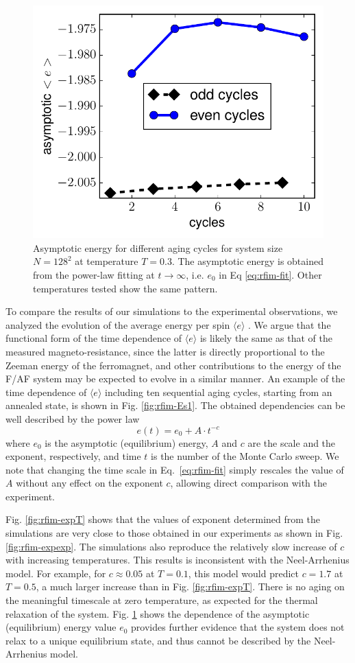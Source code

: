 \begin{figure}
\centering \includegraphics[width=0.5\columnwidth]{Chapter-4/asymptotic_E_T03_10cycles}
\protect\caption{Asymptotic energy for different aging cycles for system size $N=128^2$ at temperature $T=0.3$. The asymptotic energy is obtained from the power-law fitting at $t\rightarrow\infty$, i.e. $e_0$ in Eq \ref{eq:rfim-fit}. Other temperatures tested show the same pattern.} 
\label{fig:rfim-asm}
\end{figure}

To compare the results of our simulations to the experimental observations, we analyzed the evolution of the average
energy per spin $\langle e \rangle$ . We argue that the functional form of the time dependence of $\langle e \rangle$ is likely the same as that of the measured magneto-resistance, since the latter is directly proportional to the Zeeman energy of the ferromagnet, and other contributions to the energy of the F/AF system may be expected to evolve in a similar manner. An example of the time dependence of $\langle e \rangle$ including ten sequential aging cycles, starting from an annealed state, is shown in Fig. \ref{fig:rfim-Es1}. The obtained dependencies can be well described by the power law
\begin{equation}
e(t)=e_{0}+A\cdot  t^{-c}
\label{eq:rfim-fit}
\end{equation}
where $e_{0}$ is the asymptotic (equilibrium) energy, $A$ and $c$ are the scale and the exponent, respectively, and time $t$ is the number of the Monte Carlo sweep. We note that  changing the time scale in Eq.~\ref{eq:rfim-fit} simply rescales the value of $A$ without any effect on the exponent $c$, allowing direct comparison with the experiment. 

Fig. \ref{fig:rfim-expT} shows that the values of exponent determined from the simulations are very close to those obtained in our experiments as shown in Fig. \ref{fig:rfim-expexp}. The simulations also reproduce the relatively slow increase of $c$ with increasing temperatures. This results is inconsistent with the Neel-Arrhenius model. For example, for $c \approx 0.05$ at $T=0.1$, this model would predict $c=1.7$ at $T=0.5$, a much larger increase than in Fig. \ref{fig:rfim-expT}. There is no aging on the meaningful timescale at zero temperature, as expected for the thermal relaxation of the system. Fig. \ref{fig:rfim-asm} shows the dependence of the asymptotic (equilibrium) energy value $e_0$ provides further evidence that the system does not relax to a unique equilibrium state, and thus cannot be described by the Neel-Arrhenius model.



